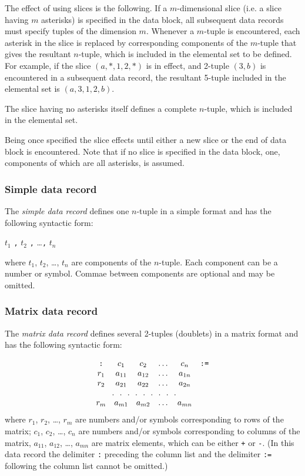 \documentclass[10pt]{article}
\begin{document}
The effect of using slices is the following. If a $m$-dimensional slice
(i.e. a slice having $m$ asterisks) is specified in the data block, all
subsequent data records must specify tuples of the dimension $m$.
Whenever a $m$-tuple is encountered, each asterisk in the slice is
replaced by corresponding components of the $m$-tuple that gives the
resultant $n$-tuple, which is included in the elemental set to be
defined. For example, if the slice $(a,*,1,2,*)$ is in effect, and
2-tuple $(3,b)$ is encountered in a subsequent data record, the
resultant 5-tuple included in the elemental set is $(a,3,1,2,b)$.

The slice having no asterisks itself defines a complete $n$-tuple,
which is included in the elemental set.

Being once specified the slice effects until either a new slice or the
end of data block is encountered. Note that if no slice is specified in
the data block, one, components of which are all asterisks, is assumed.

\subsubsection{Simple data record}

The {\it simple data record} defines one $n$-tuple in a simple format
and has the following syntactic form:

\medskip

\noindent\hfil
$t_1$ {\tt,} $t_2$ {\tt,} \dots {\tt,} $t_n$

\medskip

\noindent where $t_1$, $t_2$, \dots, $t_n$ are components of the
$n$-tuple. Each component can be a number or symbol. Commae between
components are optional and may be omitted.

\subsubsection{Matrix data record}

The {\it matrix data record} defines several 2-tuples (doublets) in
a matrix format and has the following syntactic form:

\newpage

$$\begin{array}{cccccc}
\mbox{{\tt:}}&c_1&c_2&\dots&c_n&\mbox{{\tt:=}}\\
r_1&a_{11}&a_{12}&\dots&a_{1n}&\\
r_2&a_{21}&a_{22}&\dots&a_{2n}&\\
\multicolumn{5}{c}{.\ \ .\ \ .\ \ .\ \ .\ \ .\ \ .\ \ .\ \ .}&\\
r_m&a_{m1}&a_{m2}&\dots&a_{mn}&\\
\end{array}$$
where $r_1$, $r_2$, \dots, $r_m$ are numbers and/or symbols
corresponding to rows of the matrix; $c_1$, $c_2$, \dots, $c_n$ are
numbers and/or symbols corresponding to columns of the matrix, $a_{11}$,
$a_{12}$, \dots, $a_{mn}$ are matrix elements, which can be either
{\tt+} or {\tt-}. (In this data record the delimiter {\tt:} preceding
the column list and the delimiter {\tt:=} following the column list
cannot be omitted.)
\end{document}
